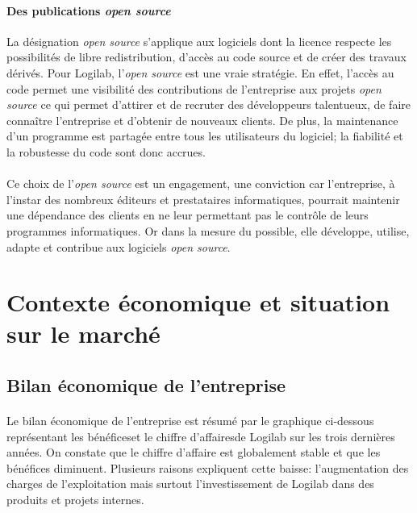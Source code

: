 \documentclass {report}
\begin{document}
\paragraph{Des publications \textit{open source}}
La désignation \textit{open source} s'applique aux logiciels dont la licence respecte les possibilités de libre redistribution, d'accès au code source et de créer des travaux dérivés. Pour Logilab, l'\textit{open source} est une vraie stratégie. En effet, l'accès au code permet une visibilité des contributions de l'entreprise aux projets \textit{open source} ce qui permet d'attirer et de recruter des développeurs talentueux, de faire connaître l'entreprise et d'obtenir de nouveaux clients. De plus, la maintenance d'un programme est partagée entre tous les utilisateurs du logiciel; la fiabilité et la robustesse du code sont donc accrues.

\paragraph{}
Ce choix de l'\textit{open source} est un engagement, une conviction car l'entreprise, à l'instar des nombreux éditeurs et prestataires informatiques, pourrait maintenir une dépendance des clients en ne leur permettant pas le contrôle de leurs programmes informatiques. Or dans la mesure du possible, elle développe, utilise, adapte et contribue aux logiciels \textit{open source}.





\section{Contexte économique et situation sur le marché}
\subsection{Bilan économique de l'entreprise}

\paragraph{}Le bilan économique de l'entreprise est résumé par le graphique ci-dessous représentant les bénéfices\footnotemark[1] et le chiffre d'affaires\footnotemark[2] de Logilab sur les trois dernières années. On constate que le chiffre d'affaire est globalement stable et que les bénéfices diminuent. Plusieurs raisons expliquent cette baisse: l'augmentation des charges de l'exploitation mais surtout l'investissement de Logilab dans des produits et projets internes.
\end{document}
